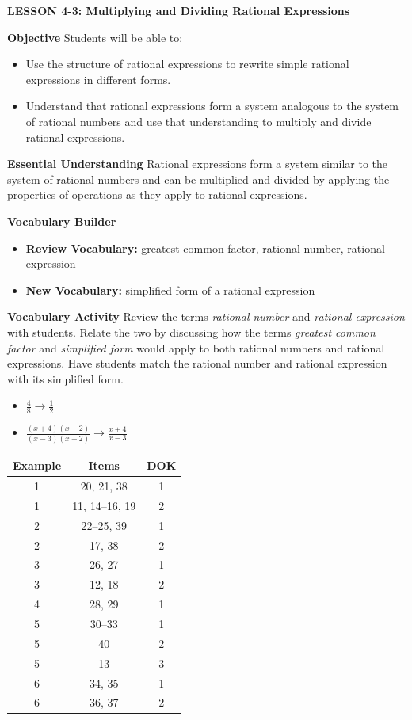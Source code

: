 \documentclass{article}
\newenvironment{lesson-meta}{}{}
\newenvironment{item-analysis}{}{}
\begin{document}
\begin{lesson-meta}
\textbf{LESSON 4-3: Multiplying and Dividing Rational Expressions}

\textbf{Objective}
Students will be able to:
\begin{itemize}
    \item Use the structure of rational expressions to rewrite simple rational expressions in different forms.
    \item Understand that rational expressions form a system analogous to the system of rational numbers and use that understanding to multiply and divide rational expressions.
\end{itemize}

\textbf{Essential Understanding}
Rational expressions form a system similar to the system of rational numbers and can be multiplied and divided by applying the properties of operations as they apply to rational expressions.

\textbf{Vocabulary Builder}
\begin{itemize}
    \item \textbf{Review Vocabulary:} greatest common factor, rational number, rational expression
    \item \textbf{New Vocabulary:} simplified form of a rational expression
\end{itemize}

\textbf{Vocabulary Activity}
Review the terms \textit{rational number} and \textit{rational expression} with students. Relate the two by discussing how the terms \textit{greatest common factor} and \textit{simplified form} would apply to both rational numbers and rational expressions. Have students match the rational number and rational expression with its simplified form.
\begin{itemize}
    \item $\frac{4}{8} \longrightarrow \frac{1}{2}$
    \item $\frac{(x+4)(x-2)}{(x-3)(x-2)} \longrightarrow \frac{x+4}{x-3}$
\end{itemize}
\end{lesson-meta}

\begin{item-analysis}
\begin{tabular}{ccc}
\toprule
\textbf{Example} & \textbf{Items} & \textbf{DOK} \\
\midrule
1 & 20, 21, 38 & 1 \\
1 & 11, 14--16, 19 & 2 \\
2 & 22--25, 39 & 1 \\
2 & 17, 38 & 2 \\
3 & 26, 27 & 1 \\
3 & 12, 18 & 2 \\
4 & 28, 29 & 1 \\
5 & 30--33 & 1 \\
5 & 40 & 2 \\
5 & 13 & 3 \\
6 & 34, 35 & 1 \\
6 & 36, 37 & 2 \\
\bottomrule
\end{tabular}
\end{item-analysis}
\end{document}

